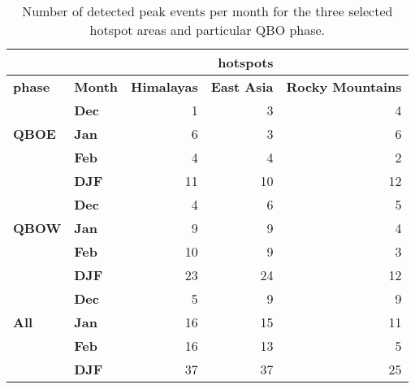\begin{table}
\caption{Number of detected peak events per month for the three selected hotspot areas and particular QBO phase.}
\centering
\begin{tabular}{ll|rrr}


& & & \textbf{hotspots} & \\
\hline
\textbf{phase} & \textbf{Month} &    \textbf{Himalayas} & \textbf{East Asia} & \textbf{ Rocky Mountains}       \\
\hline
\hline
     & \textbf{Dec} &        1 &         3 &       4 \\
\textbf{QBOE} & \textbf{Jan}  &        6 &         3 &       6 \\
     & \textbf{Feb}  &        4 &         4 &       2 \\
\hline
    & \textbf{DJF}  &        11 &         10 &       12 \\
\hline
\hline
     & \textbf{Dec} &        4 &         6 &       5 \\
\textbf{QBOW} & \textbf{Jan}  &        9 &         9 &       4 \\
     & \textbf{Feb}  &       10 &         9 &       3 \\
\hline
      & \textbf{DJF}  &        23 &         24 &       12 \\
\hline
\hline
 &	\textbf{Dec}    &       5 &       9   &    9  \\
\textbf{All} &	\textbf{Jan}     &      16 &       15  &   11  \\
 &	\textbf{Feb}    &      16 &  13   &    5       \\
 \hline
  & \textbf{DJF}  &        37 &         37 &       25 \\
\hline
\hline

\end{tabular}
\label{tab:events}
\end{table}